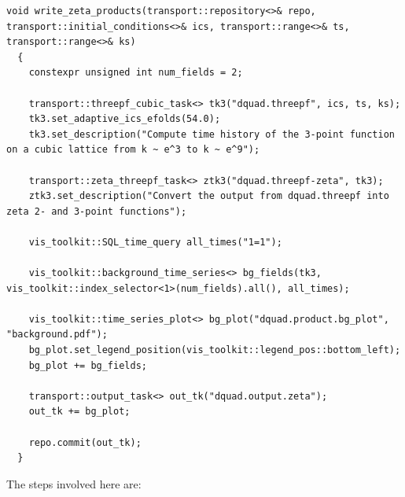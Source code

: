 \documentclass[11pt,a4paper]{article}
\begin{document}
\begin{verbatim}
void write_zeta_products(transport::repository<>& repo, transport::initial_conditions<>& ics, transport::range<>& ts, transport::range<>& ks)
  {
	constexpr unsigned int num_fields = 2;

    transport::threepf_cubic_task<> tk3("dquad.threepf", ics, ts, ks);
    tk3.set_adaptive_ics_efolds(54.0);
    tk3.set_description("Compute time history of the 3-point function on a cubic lattice from k ~ e^3 to k ~ e^9");

    transport::zeta_threepf_task<> ztk3("dquad.threepf-zeta", tk3);
    ztk3.set_description("Convert the output from dquad.threepf into zeta 2- and 3-point functions");

    vis_toolkit::SQL_time_query all_times("1=1");

    vis_toolkit::background_time_series<> bg_fields(tk3, vis_toolkit::index_selector<1>(num_fields).all(), all_times);

    vis_toolkit::time_series_plot<> bg_plot("dquad.product.bg_plot", "background.pdf");
    bg_plot.set_legend_position(vis_toolkit::legend_pos::bottom_left);
    bg_plot += bg_fields;

    transport::output_task<> out_tk("dquad.output.zeta");
    out_tk += bg_plot;

    repo.commit(out_tk);
  }
\end{verbatim}
The steps involved here are:
\end{document}
